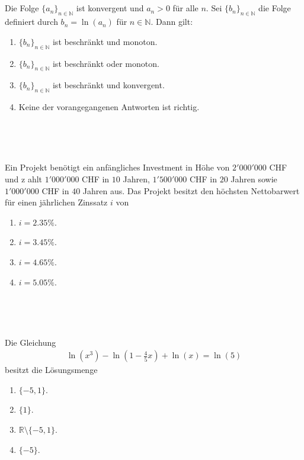 \subsection*{}
Die Folge $\lbrace a_n \rbrace_{n \in \mathbb{N}}$ ist konvergent und $a_n > 0$
für alle $n$.
Sei $\lbrace b_n \rbrace_{n \in \mathbb{N}}$ die Folge definiert durch
$b_n = \ln(a_n)$ für $n \in \mathbb{N}$.
Dann gilt:\\

\renewcommand{\labelenumi}{(\alph{enumi})}
\begin{enumerate}
\item $\lbrace b_n \rbrace_{n \in \mathbb{N}}$ ist beschränkt und monoton.
\item $\lbrace b_n \rbrace_{n \in \mathbb{N}}$ ist beschränkt oder monoton.
\item $\lbrace b_n \rbrace_{n \in \mathbb{N}}$ ist beschränkt und konvergent.
\item Keine der vorangegangenen Antworten ist richtig.
\end{enumerate}
\ \\
\\
\subsection*{}
Ein Projekt benötigt ein anfängliches Investment in Höhe von $2'000'000$ CHF
und z	ahlt $1'000'000$ CHF in $10$ Jahren, $1'500'000$ CHF in $20$ Jahren sowie $1'000'000$ CHF in $40$ Jahren aus.
Das Projekt besitzt den höchsten Nettobarwert für einen jährlichen Zinssatz $i$ von
\renewcommand{\labelenumi}{(\alph{enumi})}
\begin{enumerate}
\item $i = 2.35 \%$.
\item $i = 3.45 \%$.
\item $i = 4.65 \%$.
\item $i = 5.05 \%$.
\end{enumerate}
\ \\
\\
\subsection*{}
Die Gleichung
\begin{align*}
\ln(x^3) - \ln \left( 1 - \frac{4}{5} x \right) + \ln(x) = \ln(5)
\end{align*}
besitzt die Lösungsmenge
\renewcommand{\labelenumi}{(\alph{enumi})}
\begin{enumerate}
\item $\lbrace -5,1 \rbrace$.
\item $\lbrace 1 \rbrace$.
\item $\mathbb{R} \setminus \lbrace -5, 1 \rbrace$.
\item $\lbrace -5 \rbrace$.
\end{enumerate}
\newpage
